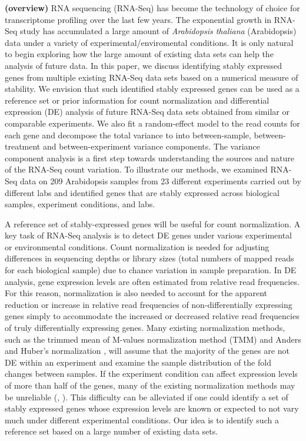 \documentclass[11pt, a4paper]{article}
\begin{document}
\textbf{(overview)}
RNA sequencing (RNA-Seq) has become the technology of choice for transcriptome
profiling over the last few years. The exponential growth in RNA-Seq study has
accumulated a large amount of \textit{Arabidopsis thaliana} (Arabidopsis) data under a variety of
experimental/enviromental conditions.  It is only natural to begin exploring
how the large amount of existing data sets can help the analysis of future
data.  In this paper, we discuss identifying stably expressed genes from
multiple existing RNA-Seq data sets based on a numerical measure of stability.
We envision that such identified stably expressed genes can be used as a
reference set or prior information for count normalization and differential
expression (DE) analysis of future RNA-Seq data sets obtained from similar or
comparable experiments.  We also fit a random-effect model to the read counts
for each gene and decompose the total variance to into between-sample,
between-treatment and between-experiment variance components. The variance component
analysis is a first step towards understanding the sources and nature of the
RNA-Seq count variation.  To illustrate our methods, we examined RNA-Seq data
on 209 Arabidopsis  samples from 23 different experiments carried out by
different labs and identified genes that are stably expressed across
biological samples, experiment conditions, and labs.  

A reference set of stably-expressed genes will be useful for count
normalization.  A key task of RNA-Seq analysis is to detect DE genes under
various experimental or environmental conditions. Count normalization is
needed for adjusting differences in sequencing depths or library sizes (total
numbers of mapped reads for each biological sample) due to chance variation in
sample preparation.  In DE analysis, gene expression levels are often
estimated from relative read frequencies. For this reason, normalization is
also needed to account for the apparent reduction or increase in relative read
frequencies of non-differentially expressing genes simply to accommodate the
increased or decreased relative read frequencies of truly differentially
expressing genes.  Many existing normalization methods, such as the trimmed
mean of M-values normalization method (TMM) \citep{robinson2010scaling} and
Anders and Huber's normalization \citep{anders2010differential}, will  assume that the
majority of the genes are not DE within an experiment and examine the sample
distribution of the fold changes between samples.
If the experiment condition can affect expression levels of more than half of
the genes, many of the existing normalization methods may be unreliable
(\cite{loven2012revisiting}, \cite{wu2013use}).  This difficulty can be
alleviated if one could identify a set of stably expressed genes whose
expression levels are known or expected to not vary much under different
experimental conditions. Our idea is to identify such a reference set based on
a large number of existing data sets.
\end{document}
